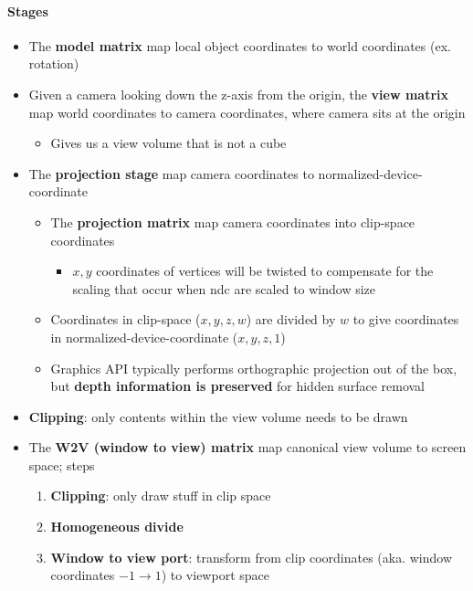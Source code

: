   \paragraph{Stages}
  \begin{itemize}
    \item The \textbf{model matrix} map local object coordinates to
    world coordinates (ex. rotation)
    \item Given a camera looking down the z-axis from the origin,
    the \textbf{view matrix} map world coordinates to camera coordinates,
    where camera sits at the origin
    \begin{itemize}
      \item Gives us a view volume that is not a cube
    \end{itemize}

    \item The \textbf{projection stage} map camera coordinates to
    \gls{normalized-device-coordinate}
    \begin{itemize}
      \item The \textbf{projection matrix} map camera coordinates into
      \gls{clip-space} coordinates
      \begin{itemize}
        \item $ x, y $ coordinates of vertices will be twisted to compensate for
        the scaling that occur when \acrshort{ndc} are scaled to window size
      \end{itemize}

      \item Coordinates in \gls{clip-space} ($ x, y, z, w $) are divided by
      $ w $ to give coordinates in \gls{normalized-device-coordinate}
      ($ x, y, z, 1 $)
      \item Graphics API typically performs orthographic projection out of
      the box, but \textbf{depth information is preserved} for hidden surface
      removal
    \end{itemize}

    \item \textbf{Clipping}: only contents within the view volume needs to be
    drawn
    \item The \textbf{W2V (window to view) matrix} map canonical view volume
    to screen space; steps
    \begin{enumerate}
      \item \textbf{Clipping}: only draw stuff in clip space
      \item \textbf{Homogeneous divide}
      \item \textbf{Window to view port}: transform from clip coordinates
      (aka. window coordinates $ -1 \to 1 $) to viewport space
    \end{enumerate}
  \end{itemize}

